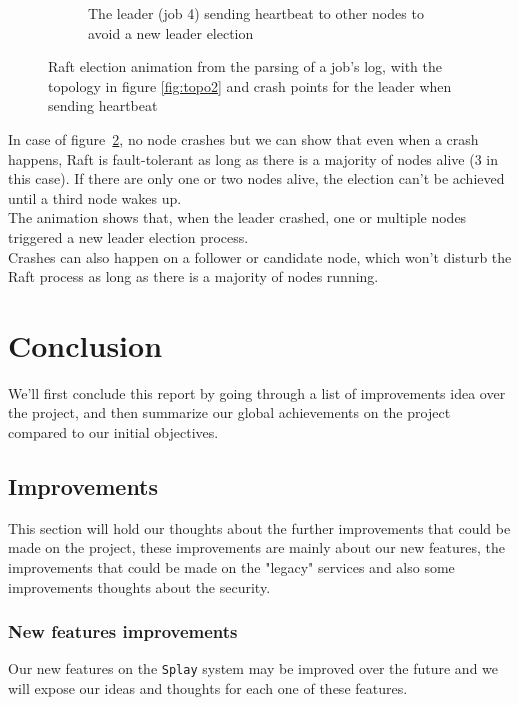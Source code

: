 \documentclass{eplmastersthesis}
\begin{document}
\begin{figure}[H]
\begin{subfigure}{.45\textwidth}
            \caption{The leader (job 4) sending heartbeat to other nodes to avoid a new leader election}
            \label{fig:ele4}
          \end{subfigure}

          \caption{Raft election animation from the parsing of a job's log, with the topology in figure \ref{fig:topo2}
          and crash points for the leader when sending heartbeat}
          \label{fig:election}
        \end{figure}

        In case of figure~\ref{fig:election}, no node crashes but we can show
        that even when a crash happens, Raft is fault-tolerant as long as there
        is a majority of nodes alive (3 in this case). If there are only one or
        two nodes alive, the election can't be achieved until a third node
        wakes up.\\
        The animation shows that, when the leader crashed, one or multiple
        nodes triggered a new leader election process.\\
        Crashes can also happen on a follower or candidate node, which won't
        disturb the Raft process as long as there is a majority of nodes
        running.

  \chapter{Conclusion}

    We'll first conclude this report by going through a list of improvements
    idea over the project, and then summarize our global achievements on the
    project compared to our initial objectives.

    \section{Improvements}

      This section will hold our thoughts about the further improvements
      that could be made on the project, these improvements are mainly about
      our new features, the improvements that could be made on the "legacy"
      services and also some improvements thoughts about the security.

      \subsection{New features improvements}

        Our new features on the \texttt{Splay} system may be improved over the future
        and we will expose our ideas and thoughts for each one of these
        features.
\end{document}
